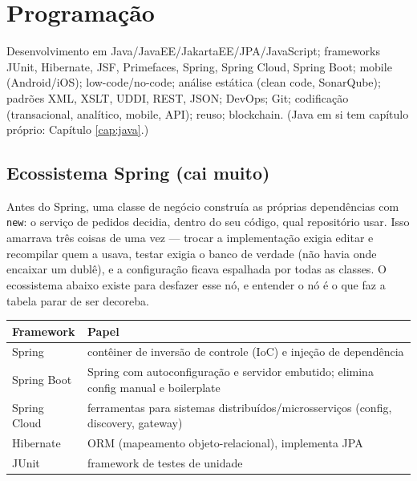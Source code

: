 \chapter{Programação}
\label{cap:programacao}

\begin{edital}
Desenvolvimento em Java/JavaEE/JakartaEE/JPA/JavaScript; frameworks JUnit,
Hibernate, JSF, Primefaces, Spring, Spring Cloud, Spring Boot; mobile
(Android/iOS); low-code/no-code; análise estática (clean code, SonarQube);
padrões XML, XSLT, UDDI, REST, JSON; DevOps; Git; codificação (transacional,
analítico, mobile, API); reuso; blockchain. (Java em si tem capítulo próprio:
Capítulo \ref{cap:java}.)
\end{edital}

\section{Ecossistema Spring (cai muito)}

Antes do Spring, uma classe de negócio construía as próprias dependências com
\texttt{new}: o serviço de pedidos decidia, dentro do seu código, qual
repositório usar. Isso amarrava três coisas de uma vez --- trocar a
implementação exigia editar e recompilar quem a usava, testar exigia o banco de
verdade (não havia onde encaixar um dublê), e a configuração ficava espalhada
por todas as classes. O ecossistema abaixo existe para desfazer esse nó, e
entender o nó é o que faz a tabela parar de ser decoreba.

\begin{center}
\begin{tabular}{@{}p{2.6cm}p{8.6cm}@{}}
\toprule
\textbf{Framework} & \textbf{Papel} \\
\midrule
Spring & contêiner de inversão de controle (IoC) e injeção de dependência \\
Spring Boot & Spring com autoconfiguração e servidor embutido; elimina config manual e boilerplate \\
Spring Cloud & ferramentas para sistemas distribuídos/microsserviços (config, discovery, gateway) \\
Hibernate & ORM (mapeamento objeto-relacional), implementa JPA \\
JUnit & framework de testes de unidade \\
\bottomrule
\end{tabular}
\end{center}


